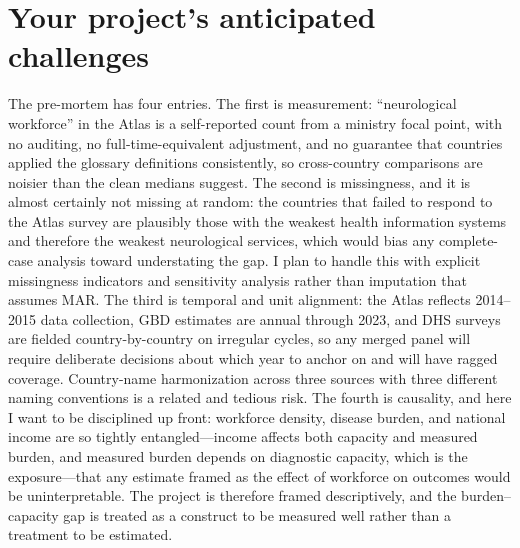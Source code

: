 \documentclass[11pt]{article}
\begin{document}
\section{Your project's anticipated challenges}

The pre-mortem has four entries. The first is measurement: ``neurological
workforce'' in the Atlas is a self-reported count from a ministry focal point,
with no auditing, no full-time-equivalent adjustment, and no guarantee that
countries applied the glossary definitions consistently, so cross-country
comparisons are noisier than the clean medians suggest. The second is
missingness, and it is almost certainly not missing at random: the countries that
failed to respond to the Atlas survey are plausibly those with the weakest health
information systems and therefore the weakest neurological services, which would
bias any complete-case analysis toward understating the gap. I plan to handle
this with explicit missingness indicators and sensitivity analysis rather than
imputation that assumes MAR. The third is temporal and unit alignment: the Atlas
reflects 2014--2015 data collection, GBD estimates are annual through 2023, and
DHS surveys are fielded country-by-country on irregular cycles, so any merged
panel will require deliberate decisions about which year to anchor on and will
have ragged coverage. Country-name harmonization across three sources with three
different naming conventions is a related and tedious risk. The fourth is
causality, and here I want to be disciplined up front: workforce density,
disease burden, and national income are so tightly entangled---income affects
both capacity and measured burden, and measured burden depends on diagnostic
capacity, which is the exposure---that any estimate framed as the effect of
workforce on outcomes would be uninterpretable. The project is therefore framed
descriptively, and the burden--capacity gap is treated as a construct to be
measured well rather than a treatment to be estimated.
\end{document}
